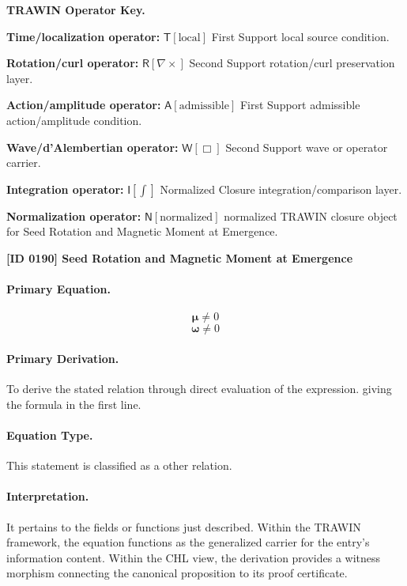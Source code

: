 \par\vspace{0.45\baselineskip}
\noindent\begin{minipage}[t]{\linewidth}
\begingroup
\small
\raggedright
\textbf{TRAWIN Operator Key.}\par
\noindent\textbf{Time/localization operator:} $\mathsf{T}\!\left[\mathrm{local}\right]$ First Support local source condition.\par
\noindent\textbf{Rotation/curl operator:} $\mathsf{R}\!\left[\nabla\times\right]$ Second Support rotation/curl preservation layer.\par
\noindent\textbf{Action/amplitude operator:} $\mathsf{A}\!\left[\mathrm{admissible}\right]$ First Support admissible action/amplitude condition.\par
\noindent\textbf{Wave/d'Alembertian operator:} $\mathsf{W}\!\left[\Box\right]$ Second Support wave or operator carrier.\par
\noindent\textbf{Integration operator:} $\mathsf{I}\!\left[\int\right]$ Normalized Closure integration/comparison layer.\par
\noindent\textbf{Normalization operator:} $\mathsf{N}\!\left[\mathrm{normalized}\right]$ normalized TRAWIN closure object for Seed Rotation and Magnetic Moment at Emergence.\par
\endgroup
\end{minipage}

\clearpage
\noindent\textbf{[ID 0190] Seed Rotation and Magnetic Moment at Emergence}\par
\vspace{0.35em}
\paragraph{Primary Equation.}
\[
\boldsymbol{\mu} \neq 0
\]
\[
\mathbf{\omega} \neq 0
\]

\paragraph{Primary Derivation.}
To derive the stated relation through direct evaluation of the expression. giving the formula in the first line.
\paragraph{Equation Type.}
This statement is classified as a other relation.

\paragraph{Interpretation.}
It pertains to the fields or functions just described. Within the TRAWIN framework, the equation functions as the generalized carrier for the entry’s information content. Within the CHL view, the derivation provides a witness morphism connecting the canonical proposition to its proof certificate.

